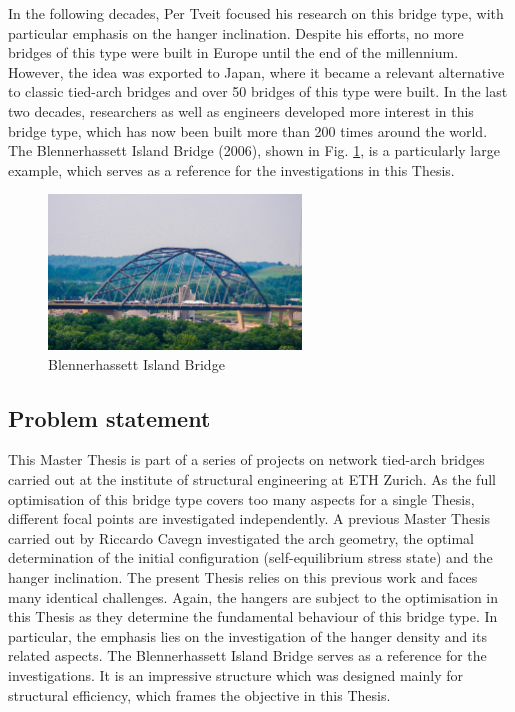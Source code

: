 In the following decades, Per Tveit focused his research on this bridge type, with particular emphasis on the hanger inclination. Despite his efforts, no more bridges of this type were built in Europe until the end of the millennium. However, the idea was exported to Japan, where it became a relevant alternative to classic tied-arch bridges and over 50 bridges of this type were built. In the last two decades, researchers as well as engineers developed more interest in this bridge type, which has now been built more than 200 times around the world. The Blennerhassett Island Bridge (2006), shown in Fig. \ref{fig:Blennerhassett}, is a particularly large example, which serves as a reference for the investigations in this Thesis.

\begin{figure}[H]
    \centering
    \includegraphics[width=0.6\textwidth]{overleaf/Pictures/Blennerhassett.jpg}
    \caption{Blennerhassett Island Bridge \cite{Blennerhassett}}
    \label{fig:Blennerhassett}
\end{figure}

\subsection{Problem statement} \label{sec:int_prob}
This Master Thesis is part of a series of projects on network tied-arch bridges carried out at the institute of structural engineering at ETH Zurich. As the full optimisation of this bridge type covers too many aspects for a single Thesis, different focal points are investigated independently. A previous Master Thesis carried out by Riccardo Cavegn investigated the arch geometry, the optimal determination of the initial configuration (self-equilibrium stress state) and the hanger inclination. The present Thesis relies on this previous work and faces many identical challenges. Again, the hangers are subject to the optimisation in this Thesis as they determine the fundamental behaviour of this bridge type. In particular, the emphasis lies on the investigation of the hanger density and its related aspects. The Blennerhassett Island Bridge serves as a reference for the investigations. It is an impressive structure which was designed mainly for structural efficiency, which frames the objective in this Thesis.  

